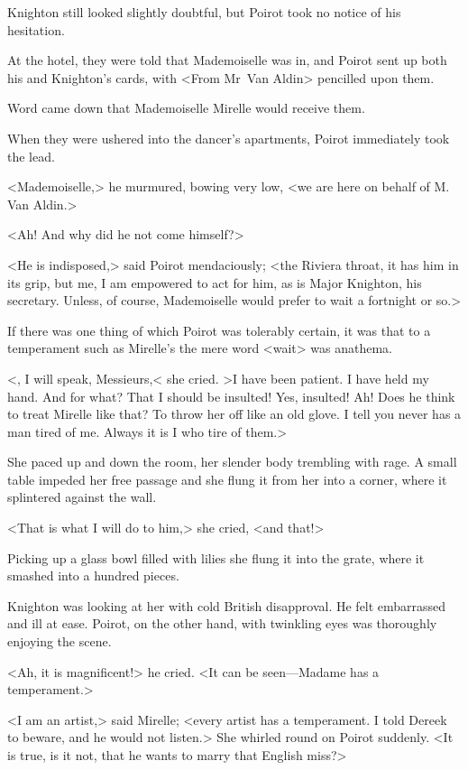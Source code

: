 Knighton still looked slightly doubtful, but Poirot took no notice of his hesitation.

At the hotel, they were told that Mademoiselle was in, and Poirot sent up both his and Knighton's cards, with <From Mr~Van Aldin> pencilled upon them.

Word came down that Mademoiselle Mirelle would receive them.

When they were ushered into the dancer's apartments, Poirot immediately took the lead.

<Mademoiselle,> he murmured, bowing very low, <we are here on behalf of M. Van Aldin.>

<Ah! And why did he not come himself?>

<He is indisposed,> said Poirot mendaciously; <the Riviera throat, it has him in its grip, but me, I am empowered to act for him, as is Major Knighton, his secretary. Unless, of course, Mademoiselle would prefer to wait a fortnight or so.>

If there was one thing of which Poirot was tolerably certain, it was that to a temperament such as Mirelle's the mere word <wait> was anathema.

<, I will speak, Messieurs,< she cried. >I have been patient. I have held my hand. And for what? That I should be insulted! Yes, insulted! Ah! Does he think to treat Mirelle like that? To throw her off like an old glove. I tell you never has a man tired of me. Always it is I who tire of them.>

She paced up and down the room, her slender body trembling with rage. A small table impeded her free passage and she flung it from her into a corner, where it splintered against the wall.

<That is what I will do to him,> she cried, <and that!>

Picking up a glass bowl filled with lilies she flung it into the grate, where it smashed into a hundred pieces.

Knighton was looking at her with cold British disapproval. He felt embarrassed and ill at ease. Poirot, on the other hand, with twinkling eyes was thoroughly enjoying the scene.

<Ah, it is magnificent!> he cried. <It can be seen—Madame has a temperament.>

<I am an artist,> said Mirelle; <every artist has a temperament. I told Dereek to beware, and he would not listen.> She whirled round on Poirot suddenly. <It is true, is it not, that he wants to marry that English miss?>

